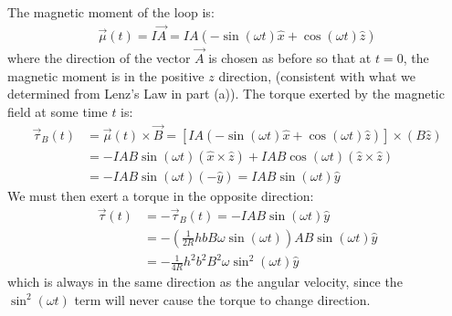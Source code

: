 \begin{solution}
\begin{parts}
The magnetic moment of the loop is:
\begin{align*}
\vec \mu(t) = I\vec A=IA(-\sin(\omega t)\hat x+\cos(\omega t)\hat z)
\end{align*}
where the direction of the vector $\vec A$ is chosen as before so that at $t=0$, the magnetic moment is in the positive $z$ direction, (consistent with what we determined from Lenz's Law in part (a)). The torque exerted by the magnetic field at some time $t$ is:
\begin{align*}
\vec \tau_B(t)&=\vec \mu(t)\times\vec B=[IA(-\sin(\omega t)\hat x+\cos(\omega t)\hat z)]\times (B\hat z)\\
&=-IAB\sin(\omega t)(\hat x\times\hat z)+IAB\cos(\omega t)(\hat z\times\hat z)\\
&=-IAB\sin(\omega t)(-\hat y)=IAB\sin(\omega t)\hat y
\end{align*} 
We must then exert a torque in the opposite direction:
\begin{align*}
\vec\tau(t)&=-\vec\tau_B(t)=-IAB\sin(\omega t)\hat y\\
&=-\left(\frac{1}{2R}hbB\omega\sin(\omega t)\right)AB\sin(\omega t)\hat y\\
&=-\frac{1}{4R}h^2b^2B^2\omega\sin^2(\omega t)\hat y
\end{align*}
which is always in the same direction as the angular velocity, since the $\sin^2(\omega t)$ term will never cause the torque to change direction. 
\end{parts}
\end{solution}

